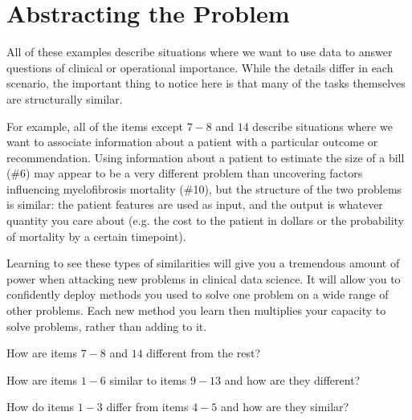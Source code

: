 
\section{Abstracting the Problem}

All of these examples describe situations where we want to use data to answer questions of clinical or operational importance. While the details differ in each scenario, the important thing to notice here is that many of the tasks themselves are structurally similar. 

For example, all of the items except $7-8$ and $14$ describe situations where we want to associate information about a patient with a particular outcome or recommendation. Using information about a patient to estimate the size of a bill (\#6) may appear to be a very different problem than uncovering factors influencing myelofibrosis mortality (\#10), but the structure of the two problems is similar: the patient features are used as input, and the output is whatever quantity you care about (e.g. the cost to the patient in dollars or the probability of mortality by a certain timepoint). 

Learning to see these types of similarities will give you a tremendous amount of power when attacking new problems in clinical data science. It will allow you to confidently deploy methods you used to solve one problem on a wide range of other problems. Each new method you learn then multiplies your capacity to solve problems, rather than adding to it. 

\begin{question}{}
How are items $7-8$ and $14$ different from the rest? 
\end{question}

\begin{question}{}
How are items $1-6$ similar to items $9-13$ and how are they different? 
\end{question}

\begin{question}{}
How do items $1-3$ differ from items $4-5$ and how are they similar? 
\end{question}

